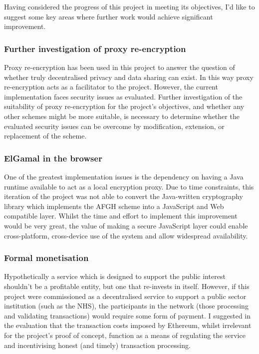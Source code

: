 Having considered the progress of this project in meeting its objectives, I'd like to suggest some key areas where further work would achieve significant improvement.

\subsubsection{Further investigation of proxy re-encryption}

Proxy re-encryption has been used in this project to answer the question of whether truly decentralised privacy and data sharing can exist. In this way proxy re-encryption acts as a facilitator to the project. However, the current implementation faces security issues as evaluated. Further investigation of the suitability of proxy re-encryption for the project's objectives, and whether any other schemes might be more suitable, is necessary to determine whether the evaluated security issues can be overcome by modification, extension, or replacement of the scheme.

\subsubsection{ElGamal in the browser}

One of the greatest implementation issues is the dependency on having a Java runtime available to act as a local encryption proxy. Due to time constraints, this iteration of the project was not able to convert the Java-written cryptography library which implements the AFGH scheme into a JavaScript and Web compatible layer. Whilst the time and effort to implement this improvement would be very great, the value of making a secure JavaScript layer could enable cross-platform, cross-device use of the system and allow widespread availability.

\subsubsection{Formal monetisation}

Hypothetically a service which is designed to support the public interest shouldn't be a profitable entity, but one that re-invests in itself. However, if this project were commissioned as a decentralised service to support a public sector institution (such as the NHS), the participants in the network (those processing and validating transactions) would require some form of payment. I suggested in the evaluation that the transaction costs imposed by Ethereum, whilst irrelevant for the project's proof of concept, function as a means of regulating the service and incentivising honest (and timely) transaction processing.

